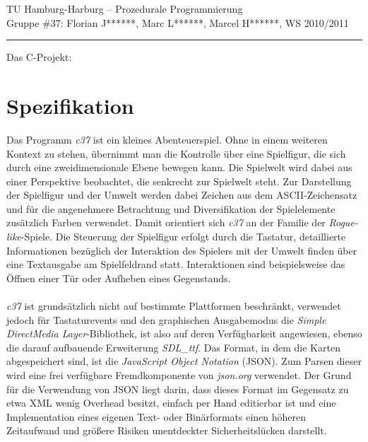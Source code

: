 \documentclass[11pt,a4paper,notitlepage]{report}
\begin{document}
	\begin{center}
		TU Hamburg-Harburg -- Prozedurale Programmierung \\
		Gruppe \#37: Florian J******, Marc L******, Marcel H******, WS 2010/2011
	\end{center}
	\rule{1.0\linewidth}{.1pt}
	\newline
	\begin{center}
		Das C-Projekt:
		\Huge
		\parbox{1.0\linewidth}{
		}
		\normalsize
	\end{center}
	
	\section*{Spezifikation}
	Das Programm \textit{c37} ist ein kleines Abenteuerspiel. Ohne in einem weiteren Kontext zu stehen, übernimmt man die Kontrolle über eine Spielfigur, die sich durch eine zweidimensionale Ebene bewegen kann. Die Spielwelt wird dabei aus einer Perspektive beobachtet, die senkrecht zur Spielwelt steht. Zur Darstellung der Spielfigur und der Umwelt werden dabei Zeichen aus dem ASCII-Zeichensatz und für die angenehmere Betrachtung und Diversifikation der Spielelemente zusätzlich Farben verwendet. Damit orientiert sich \textit{c37} an der Familie der \textit{Rogue-like}-Spiele. Die Steuerung der Spielfigur erfolgt durch die Tastatur, detaillierte Informationen bezüglich der Interaktion des Spielers mit der Umwelt finden über eine Textausgabe am Spielfeldrand statt. Interaktionen sind beispielsweise das Öffnen einer Tür oder Aufheben eines Gegenstands.
	\\
	\\
	\textit{c37} ist grundsätzlich nicht auf bestimmte Plattformen beschränkt, verwendet jedoch für Tastaturevents und den graphischen Ausgabemodus die \textit{Simple DirectMedia Layer}-Bibliothek, ist also auf deren Verfügbarkeit angewiesen, ebenso die darauf aufbauende Erweiterung \textit{SDL\_ttf}. Das Format, in dem die Karten abgespeichert sind, ist die \textit{JavaScript Object Notation} (JSON). Zum Parsen dieser wird eine frei verfügbare Fremdkomponente von \textit{json.org} verwendet. Der Grund für die Verwendung von JSON liegt darin, dass dieses Format im Gegensatz zu etwa XML wenig Overhead besitzt, einfach per Hand editierbar ist und eine Implementation eines eigenen Text- oder Binärformats einen höheren Zeitaufwand und größere Risiken unentdeckter Sicherheitslücken darstellt.
	\newpage
\end{document}
